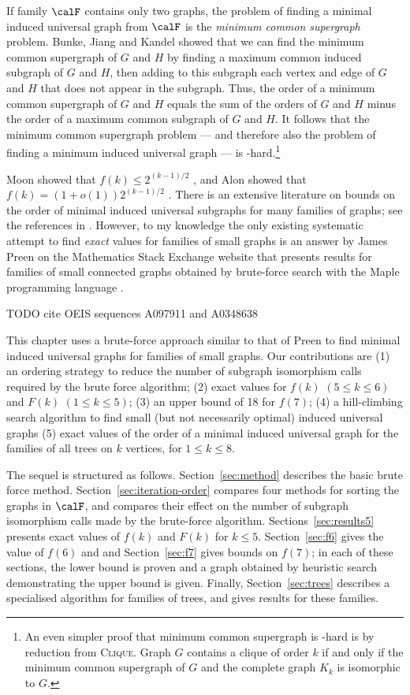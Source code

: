 If family $\calF$ contains only two graphs, the problem of finding a minimal
induced universal graph from $\calF$ is the \emph{minimum common supergraph}
problem.  Bunke, Jiang and Kandel \cite{DBLP:journals/computing/BunkeJK00}
showed that we can find the minimum common supergraph of $G$ and $H$ by
finding a maximum common induced subgraph of $G$ and $H$, then adding to this
subgraph each vertex and edge of $G$ and $H$ that does not appear in the subgraph.
Thus, the order of a minimum common supergraph of $G$ and $H$ equals the sum
of the orders of $G$ and $H$ minus the order of a maximum common subgraph
of $G$ and $H$.  It follows that the minimum common supergraph problem ---
and therefore also the problem of finding a minimum induced universal graph
--- is \NP-hard.\footnote{An even simpler proof that minimum common supergraph
is \NP-hard is by reduction from \textsc{Clique}.  Graph $G$ contains a clique
of order $k$ if and only if the minimum common supergraph of $G$ and
the complete graph $K_k$ is isomorphic to $G$.}

Moon showed that $f(k) \leq 2^{(k-1)/2}$
\cite{moon_1965}, and Alon showed that $f(k) = (1 + o(1))2^{(k-1)/2}$
\cite{alon2017asymptotically}.  There is an extensive literature on bounds on
the order of minimal induced universal subgraphs for many families of graphs;
see the references in \cite{alon2017asymptotically}.
However, to my knowledge the only
existing systematic attempt to find \emph{exact} values for families of small
graphs is an answer by James Preen on the Mathematics Stack Exchange website that
presents results for families of small connected graphs obtained by brute-force
search with the Maple programming language \cite{preen_math_se}.

TODO cite OEIS sequences
A097911 \cite{oeisA097911}
and
A0348638 \cite{oeisA348638}

This chapter uses a brute-force approach similar to that of Preen to find minimal
induced universal graphs for families of small graphs.  Our contributions
are (1) an ordering strategy to reduce the number of subgraph isomorphism
calls required by the brute force algorithm; (2) exact values for $f(k)$ $(5 \leq k \leq 6)$
and $F(k)$ $(1 \leq k \leq 5)$; (3) an upper bound of 18 for $f(7)$; (4) a hill-climbing
search algorithm to find small (but not necessarily optimal) induced universal graphs
(5) exact values of the order of a minimal induced universal graph
for the families of all trees on $k$ vertices, for $1 \leq k \leq 8$.

The sequel is structured as follows.
Section~\ref{sec:method} describes the basic brute force method.
Section~\ref{sec:iteration-order} compares four methods for sorting
the graphs in $\calF$, and compares their effect on the number of subgraph
isomorphism calls made by the brute-force algorithm.
Sections~\ref{sec:results5} presents exact
values of $f(k)$ and $F(k)$ for $k \leq 5$.
Section~\ref{sec:f6} gives the value of $f(6)$ and and
Section~\ref{sec:f7} gives bounds on $f(7)$; in each of these sections, the lower
bound is proven and a graph obtained by heuristic search demonstrating the
upper bound is given.  Finally, Section~\ref{sec:trees} describes a specialised
algorithm for families of trees, and gives results for
these families.

